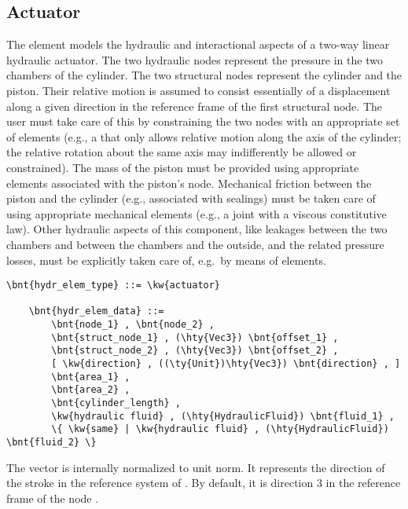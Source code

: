\subsection{Actuator}
The  element models the hydraulic and interactional aspects
of a two-way linear hydraulic actuator.
The two hydraulic nodes represent the pressure in the two chambers
of the cylinder.
The two structural nodes represent the cylinder and the piston.
Their relative motion is assumed to consist essentially
of a displacement along a given direction in the reference frame
of the first structural node.
The user must take care of this by constraining the two nodes
with an appropriate set of  elements
(e.g., a  that only allows relative motion along the axis of the cylinder;
the relative rotation about the same axis may indifferently be allowed or constrained).
The mass of the piston must be provided using appropriate elements associated with the piston's node.
Mechanical friction between the piston and the cylinder (e.g., associated with sealings)
must be taken care of using appropriate mechanical elements (e.g., a  joint with a viscous constitutive law).
Other hydraulic aspects of this component, like leakages between
the two chambers and between the chambers and the outside,
and the related pressure losses, must be explicitly taken care of,
e.g.\ by means of  elements.
\label{sec:EL:HYDR:ACTUATOR}
\begin{Verbatim}[commandchars=\\\{\}]
    \bnt{hydr_elem_type} ::= \kw{actuator}

    \bnt{hydr_elem_data} ::=
        \bnt{node_1} , \bnt{node_2} , 
        \bnt{struct_node_1} , (\hty{Vec3}) \bnt{offset_1} ,
        \bnt{struct_node_2} , (\hty{Vec3}) \bnt{offset_2} ,
        [ \kw{direction} , ((\ty{Unit})\hty{Vec3}) \bnt{direction} , ]
        \bnt{area_1} ,
        \bnt{area_2} ,
        \bnt{cylinder_length} ,
        \kw{hydraulic fluid} , (\hty{HydraulicFluid}) \bnt{fluid_1} ,
        \{ \kw{same} | \kw{hydraulic fluid} , (\hty{HydraulicFluid}) \bnt{fluid_2} \}
\end{Verbatim}
The vector  is internally normalized to unit norm.
It represents the direction of the stroke in the reference system of .
By default, it is direction 3 in the reference frame of the 
node .

